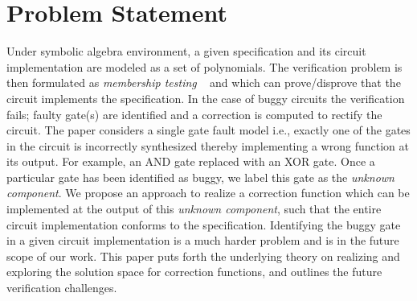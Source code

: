\section{Problem Statement}
\label{sec:prstmnt}

Under symbolic algebra environment, a given specification and its
circuit implementation are modeled as a set of polynomials. The
verification problem is then formulated as {\it membership
  testing} ~\cite{gb_book} and which can prove/disprove that the
circuit implements the specification. In the case of buggy circuits
the verification fails; faulty gate(s) are identified and a correction
is computed to rectify the circuit. The paper considers a single gate
fault model i.e., exactly one of the gates in the circuit is
incorrectly synthesized thereby implementing a wrong function at its
output. For example, an AND gate replaced with an XOR gate. Once a
particular gate has been identified as buggy, we label this gate as
the {\it unknown component}. We propose an approach to realize a
correction function which can be implemented at the output of this 
{\it unknown component}, such that the entire circuit implementation
conforms to the specification. Identifying the buggy gate in a given
circuit implementation is a much harder problem and is in the future
scope of our work. This paper puts forth the underlying theory on
realizing and exploring the solution space for correction functions,
and outlines the future verification challenges. 
